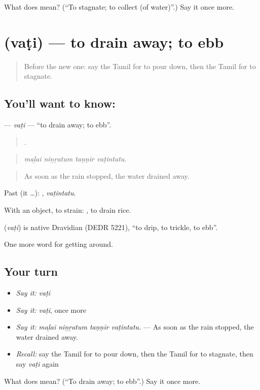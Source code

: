 \begin{tcolorbox}[breakable,colback=teal!4,colframe=teal!35!black,title={Before you move on}]
What does  mean? (\textquotedblleft{}To stagnate; to collect (of water)\textquotedblright{}.) Say it once more.
\end{tcolorbox}
\section[\texorpdfstring{\ta{வடி} (vaṭi)}{வடி (vaṭi)}]{ (vaṭi) — to drain away; to ebb}

\label{lesson:TA-C428-vati}



\begin{quote}
Before the new one: say the Tamil for to pour down, then the Tamil for to stagnate.
\end{quote}

\subsection*{You'll want to know: }
\textbf{} — \emph{vaṭi} — \textquotedblleft{}to drain away; to ebb\textquotedblright{}.

\begin{quote}
   .
\end{quote}

\begin{quote}
\emph{maḻai niṉṟatum taṇṇīr vaṭintatu.}
\end{quote}

\begin{quote}
As soon as the rain stopped, the water drained away.
\end{quote}

Past (it …): , \emph{vaṭintatu}.

With an object, to strain:  , to drain rice.

\begin{cousinweb}
\textbf{} (\emph{vaṭi}) is native Dravidian (DEDR 5221), \textquotedblleft{}to drip, to trickle, to ebb\textquotedblright{}.
\end{cousinweb}

\begin{grammarlens}[title={What you've built}]
One more word for getting around.
\end{grammarlens}

\subsection*{Your turn}
\begin{itemize}
\raggedright
  \item \emph{Say it:} \emph{vaṭi}
  \item \emph{Say it:} \emph{vaṭi}, once more
  \item \emph{Say it:} \emph{maḻai niṉṟatum taṇṇīr vaṭintatu.} — As soon as the rain stopped, the water drained away.
  \item \emph{Recall:} say the Tamil for to pour down, then the Tamil for to stagnate, then say \emph{vaṭi} again
\end{itemize}

\begin{tcolorbox}[breakable,colback=teal!4,colframe=teal!35!black,title={Before you move on}]
What does  mean? (\textquotedblleft{}To drain away; to ebb\textquotedblright{}.) Say it once more.
\end{tcolorbox}
